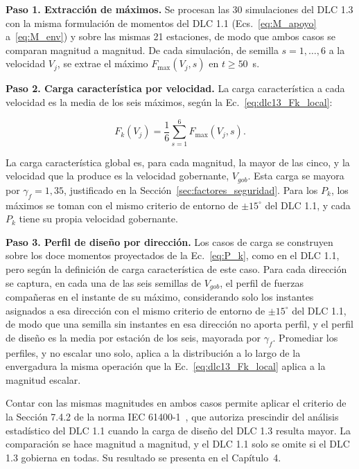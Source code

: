 \medskip
\noindent\textbf{Paso 1. Extracción de máximos.}
Se procesan las $30$ simulaciones del DLC 1.3 con la misma formulación de momentos del DLC 1.1 (Ecs.~\ref{eq:M_apoyo} a~\ref{eq:M_env}) y sobre las mismas 21 estaciones, de modo que ambos casos se comparan magnitud a magnitud. De cada simulación, de semilla $s = 1,\dots,6$ a la velocidad $V_j$, se extrae el máximo $F_{\max}(V_j, s)$ en $t \geq 50$~s.

\medskip
\noindent\textbf{Paso 2. Carga característica por velocidad.}
La carga característica a cada velocidad es la media de los seis máximos, según la Ec.~\ref{eq:dlc13_Fk_local}:

\begin{equation}
    F_k(V_j) = \frac{1}{6}\sum_{s=1}^{6} F_{\max}(V_j, s).
    \label{eq:dlc13_Fk_local}
\end{equation}

La carga característica global es, para cada magnitud, la mayor de las cinco, y la velocidad que la produce es la velocidad gobernante, $V_{gob}$. Esta carga se mayora por $\gamma_f = 1{,}35$, justificado en la Sección~\ref{sec:factores_seguridad}. Para los $P_k$, los máximos se toman con el mismo criterio de entorno de $\pm 15^\circ$ del DLC 1.1, y cada $P_k$ tiene su propia velocidad gobernante.

\medskip
\noindent\textbf{Paso 3. Perfil de diseño por dirección.}
Los casos de carga se construyen sobre los doce momentos proyectados de la Ec.~\ref{eq:P_k}, como en el DLC 1.1, pero según la definición de carga característica de este caso. Para cada dirección se captura, en cada una de las seis semillas de $V_{gob}$, el perfil de fuerzas compañeras en el instante de su máximo, considerando solo los instantes asignados a esa dirección con el mismo criterio de entorno de $\pm 15^\circ$ del DLC 1.1, de modo que una semilla sin instantes en esa dirección no aporta perfil, y el perfil de diseño es la media por estación de los seis, mayorada por $\gamma_f$. Promediar los perfiles, y no escalar uno solo, aplica a la distribución a lo largo de la envergadura la misma operación que la Ec.~\ref{eq:dlc13_Fk_local} aplica a la magnitud escalar.

Contar con las mismas magnitudes en ambos casos permite aplicar el criterio de la Sección 7.4.2 de la norma IEC 61400-1~\parencite*{IEC61400-1}, que autoriza prescindir del análisis estadístico del DLC 1.1 cuando la carga de diseño del DLC 1.3 resulta mayor. La comparación se hace magnitud a magnitud, y el DLC 1.1 solo se omite si el DLC 1.3 gobierna en todas. Su resultado se presenta en el Capítulo~4.


